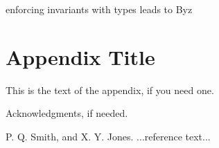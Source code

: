 \documentclass[preprint]{sigplanconf}
\begin{document}
enforcing invariants with types leads to Byz


\appendix
\section{Appendix Title}

This is the text of the appendix, if you need one.

\acks

Acknowledgments, if needed.






\begin{thebibliography}{}
\softraggedright

P. Q. Smith, and X. Y. Jones. ...reference text...

\end{thebibliography}
\end{document}
